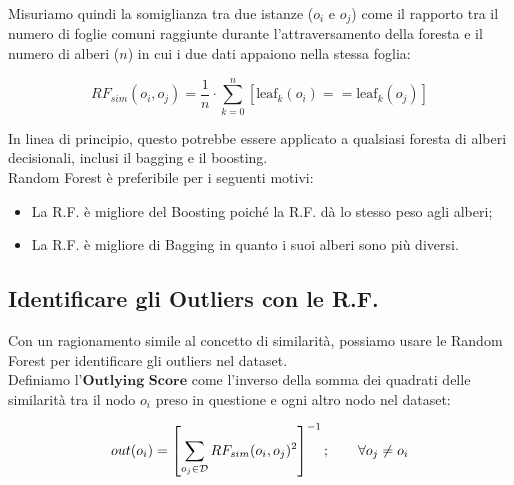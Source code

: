         Misuriamo quindi la somiglianza tra due istanze ($o_{i}$ e $o_{j}$) come il rapporto tra il numero di foglie comuni raggiunte durante l'attraversamento della foresta e il numero di alberi ($n$) in cui i due dati appaiono nella stessa foglia:

            $$ RF_{sim}(o_{i}, o_{j}) = \frac{1}{n} \cdot \sum_{k=0}^{n}{\left[ \textrm{leaf}_{k}(o_{i}) == \textrm{leaf}_{k}(o_{j}) \right]} $$

        In linea di principio, questo potrebbe essere applicato a qualsiasi foresta di alberi decisionali, inclusi il bagging e il boosting.
        \\
        Random Forest è preferibile per i seguenti motivi:
        \begin{itemize}
            \item La R.F. è migliore del Boosting poiché la R.F. dà lo stesso peso agli alberi;
            \item La R.F. è migliore di Bagging in quanto i suoi alberi sono più diversi.
        \end{itemize}

    \subsection{Identificare gli Outliers con le R.F.}
        Con un ragionamento simile al concetto di similarità, possiamo usare le Random Forest per identificare gli outliers nel dataset.
        \\
        Definiamo l'$\textbf{Outlying Score}$ come l'inverso della somma dei quadrati delle similarità tra il nodo $o_{i}$ preso in questione e ogni altro nodo nel dataset:

            $$ out(o_{i}) = \left[ \sum_{o_{j} \in \cal{D}}{RF_{sim}(o_{i}, o_{j})^{2}} \right]^{-1}; \qquad \forall{o_{j} \neq o_{i}} $$
    
